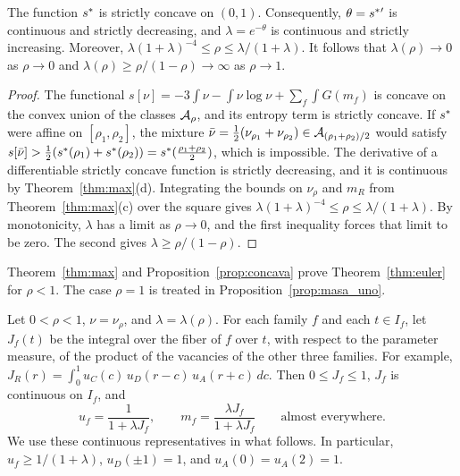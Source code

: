 \begin{proposicion}\label{prop:concava} The function $s^{*}$ is strictly concave on $(0,1)$. Consequently, $\theta=s^{*}{}'$ is
continuous and strictly decreasing, and $\lambda=e^{-\theta}$ is continuous and strictly increasing. Moreover,
$\lambda(1+\lambda)^{-4}\le\rho\le\lambda/(1+\lambda)$. It follows that $\lambda(\rho)\to0$ as $\rho\to0$ and
$\lambda(\rho)\ge\rho/(1-\rho)\to\infty$ as $\rho\to1$. \end{proposicion}

\begin{proof} The functional $s[\nu]=-3\int\nu-\int\nu\log\nu+\sum_f\int G(m_f)$ is concave on the convex union of the classes
${\mathcal{A}}_\rho$, and its entropy term is strictly concave. If $s^{*}$ were affine on $[\rho_1,\rho_2]$, the mixture
$\bar\nu=\frac12(\nu_{\rho_1}+\nu_{\rho_2})\in{\mathcal{A}}_{(\rho_1+\rho_2)/2}$ would satisfy
$s[\bar\nu]>\frac12(s^{*}(\rho_1)+s^{*}(\rho_2))=s^{*}(\frac{\rho_1+\rho_2}2)$, which is impossible. The derivative of a differentiable
strictly concave function is strictly decreasing, and it is continuous by Theorem~\ref{thm:max}(d). Integrating the bounds on
$\nu_\rho$ and $m_R$ from Theorem~\ref{thm:max}(c) over the square gives $\lambda(1+\lambda)^{-4}\le\rho\le\lambda/(1+\lambda)$. By
monotonicity, $\lambda$ has a limit as $\rho\to0$, and the first inequality forces that limit to be zero. The second gives
$\lambda\ge\rho/(1-\rho)$. \end{proof}

Theorem~\ref{thm:max} and Proposition~\ref{prop:concava} prove Theorem~\ref{thm:euler} for $\rho<1$. The case $\rho=1$ is treated in
Proposition~\ref{prop:masa_uno}.

\begin{lema}\label{lem:vacancias} Let $0<\rho<1$, $\nu=\nu_\rho$, and $\lambda=\lambda(\rho)$. For
each family $f$ and each $t\in I_f$, let $J_f(t)$ be the integral over the fiber of $f$ over $t$, with respect to the parameter
measure, of the product of the vacancies of the other three families. For example, $J_R(r)=\int_0^1u_C(c)\,u_D(r-c)\,u_A(r+c)\,dc$.
Then $0\le J_f\le1$, $J_f$ is continuous on $I_f$, and \[
 u_f=\frac1{1+\lambda J_f},\qquad m_f=\frac{\lambda J_f}{1+\lambda J_f}\qquad\text{almost everywhere}.
\] We use these continuous representatives in what follows. In particular, $u_f\ge1/(1+\lambda)$, $u_D(\pm1)=1$, and $u_A(0)=u_A(2)=1$. \end{lema}


